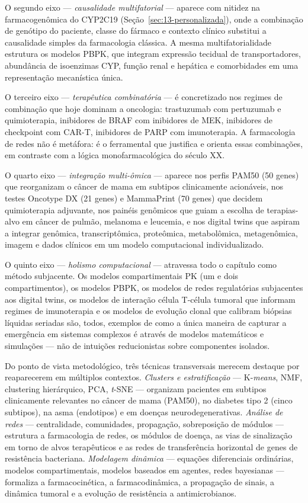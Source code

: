 O segundo eixo --- \emph{causalidade multifatorial} --- aparece com nitidez na farmacogenômica do CYP2C19 (Seção~\ref{sec:13-personalizada}), onde a combinação de genótipo do paciente, classe do fármaco e contexto clínico substitui a causalidade simples da farmacologia clássica. A mesma multifatorialidade estrutura os modelos PBPK, que integram expressão tecidual de transportadores, abundância de isoenzimas CYP, função renal e hepática e comorbidades em uma representação mecanística única.

O terceiro eixo --- \emph{terapêutica combinatória} --- é concretizado nos regimes de combinação que hoje dominam a oncologia: trastuzumab com pertuzumab e quimioterapia, inibidores de BRAF com inibidores de MEK, inibidores de checkpoint com CAR-T, inibidores de PARP com imunoterapia. A farmacologia de redes não é metáfora: é o ferramental que justifica e orienta essas combinações, em contraste com a lógica monofarmacológica do século XX.

O quarto eixo --- \emph{integração multi-ômica} --- aparece nos perfis PAM50 (50 genes) que reorganizam o câncer de mama em subtipos clinicamente acionáveis, nos testes Oncotype DX (21 genes) e MammaPrint (70 genes) que decidem quimioterapia adjuvante, nos painéis genômicos que guiam a escolha de terapias-alvo em câncer de pulmão, melanoma e leucemia, e nos digital twins que aspiram a integrar genômica, transcriptômica, proteômica, metabolômica, metagenômica, imagem e dados clínicos em um modelo computacional individualizado.

O quinto eixo --- \emph{holismo computacional} --- atravessa todo o capítulo como método subjacente. Os modelos compartimentais PK (um e dois compartimentos), os modelos PBPK, os modelos de redes regulatórias subjacentes aos digital twins, os modelos de interação célula T-célula tumoral que informam regimes de imunoterapia e os modelos de evolução clonal que calibram biópsias líquidas seriadas são, todos, exemplos de como a única maneira de capturar a emergência em sistemas complexos é através de modelos matemáticos e simulações --- não de intuições reducionistas sobre componentes isolados.

Do ponto de vista metodológico, três técnicas transversais merecem destaque por reaparecerem em múltiplos contextos. \emph{Clusters e estratificação} --- K-\emph{means}, NMF, clustering hierárquico, PCA, \emph{t}-SNE --- organizam pacientes em subtipos clinicamente relevantes no câncer de mama (PAM50), no diabetes tipo 2 (cinco subtipos), na asma (endotipos) e em doenças neurodegenerativas. \emph{Análise de redes} --- centralidade, comunidades, propagação, sobreposição de módulos --- estrutura a farmacologia de redes, os módulos de doença, as vias de sinalização em torno de alvos terapêuticos e as redes de transferência horizontal de genes de resistência bacteriana. \emph{Modelagem dinâmica} --- equações diferenciais ordinárias, modelos compartimentais, modelos baseados em agentes, redes bayesianas --- formaliza a farmacocinética, a farmacodinâmica, a propagação de sinais, a dinâmica tumoral e a evolução de resistência a antimicrobianos.


